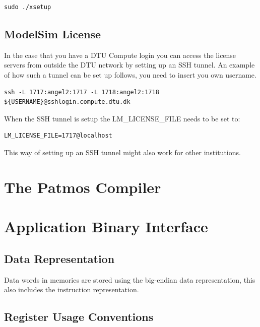 \documentclass[a4paper,fontsize=10pt,twoside,DIV15,BCOR12mm,headinclude=true,footinclude=false,pagesize,bibtotoc]{scrbook}
\begin{document}
\begin{verbatim}
sudo ./xsetup
\end{verbatim}

\section{ModelSim License}
In the case that you have a DTU Compute login you can access the license servers from outside the DTU network by setting up an SSH tunnel.
An example of how such a tunnel can be set up follows, you need to insert you own username.

\begin{verbatim}
ssh -L 1717:angel2:1717 -L 1718:angel2:1718 ${USERNAME}@sshlogin.compute.dtu.dk
\end{verbatim}

When the SSH tunnel is setup the LM\_LICENSE\_FILE needs to be set to:
\begin{verbatim}
LM_LICENSE_FILE=1717@localhost
\end{verbatim}

This way of setting up an SSH tunnel might also work for other institutions.



\chapter{The Patmos Compiler}
\label{sec:compiler}




\chapter{Application Binary Interface}
\label{sec:abi}

\section{Data Representation}

Data words in memories are stored using the big-endian data representation, this
also includes the instruction representation.

\section{Register Usage Conventions}
\end{document}
